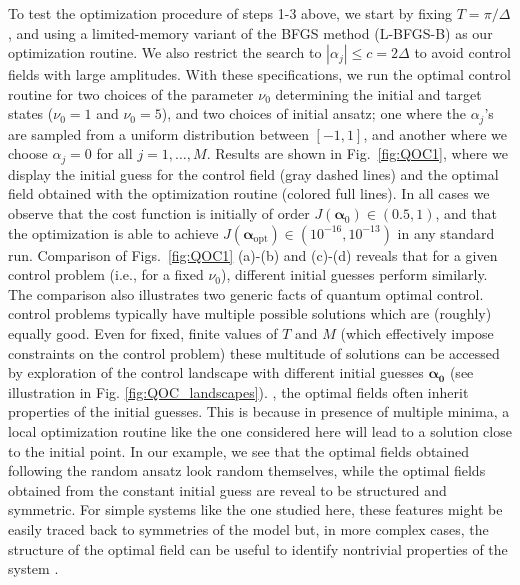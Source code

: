 To test the optimization procedure of steps 1-3 above, we start by fixing $T=\pi/\Delta$, and using a limited-memory variant of the BFGS method (L-BFGS-B) as our optimization routine. We also restrict the search to $|\alpha_j|\leq c = 2\Delta$ to avoid control fields with large amplitudes. With these specifications, we run the optimal control routine for two choices of the parameter $\nu_0$ determining the initial and target states ($\nu_0=1$ and $\nu_0=5$), and two choices of initial ansatz; one where the $\alpha_j$'s are sampled from a uniform distribution between $[-1,1]$, and another where we choose $\alpha_j=0$ for all $j=1,\ldots,M$. Results are shown in Fig.~\ref{fig:QOC1}, where we display the initial guess for the control field (gray dashed lines) and the optimal field obtained with the optimization routine (colored full lines). In all cases we observe that the cost function is initially of order $J(\bm{\alpha}_0) \in (0.5 , 1)$, and that the optimization is able to achieve $J(\bm{\alpha}_{\text{opt}})\in \left( 10^{-16},10^{-13}\right)$ in any standard run. Comparison of Figs.~\ref{fig:QOC1} (a)-(b) and (c)-(d) reveals that for a given control problem (i.e., for a fixed $\nu_0$), different initial guesses perform similarly. The comparison also illustrates two generic facts of quantum optimal control.  control problems typically have multiple possible solutions which are (roughly) equally good. Even for fixed, finite values of $T$ and $M$ (which effectively impose constraints on the control problem) these multitude of solutions can be accessed by exploration of the control landscape with different initial guesses $\bm{\alpha_0}$ (see illustration in Fig. \ref{fig:QOC_landscapes}). , the optimal fields often inherit properties of the initial guesses. This is because in presence of multiple minima,  a local optimization routine like the one considered here will lead to a solution close to the initial point. In our example, we see that the optimal fields obtained following the random ansatz look random themselves, while the optimal fields obtained from the constant initial guess are reveal to be structured and symmetric. For simple systems like the one studied here, these features might be easily traced back to symmetries of the model \cite{larocca2018} but, in more complex cases, the structure of the optimal field can be useful to identify nontrivial properties of the system \cite{rabitz2006_topology,poggi2015,bukov2018_symmetry}. \\

